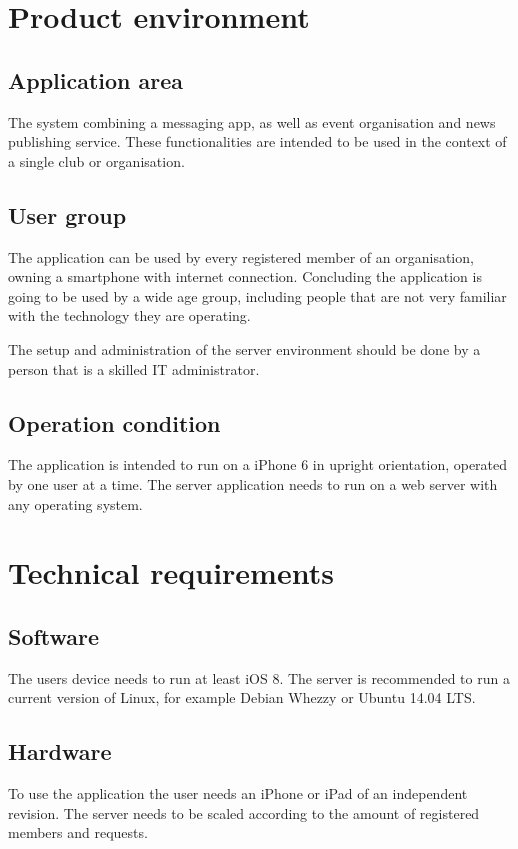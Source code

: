 \chapter{Product environment}
\section{Application area}
The system combining a messaging app, as well as event organisation and news publishing service. These functionalities are intended to be used in the context of a single club or organisation.

\section{User group}
The application can be used by every registered member of an organisation, owning a smartphone with internet connection. Concluding the application is going to be used by a wide age group, including people that are not very familiar with the technology they are operating.

The setup and administration of the server environment should be done by a person that is a skilled IT administrator.

\section{Operation condition}
The application is intended to run on a iPhone 6 in upright orientation, operated by one user at a time. The server application needs to run on a web server with any operating system.

\chapter{Technical requirements}
\section{Software}
The users device needs to run at least iOS 8. The server is recommended to run a current version of Linux, for example Debian Whezzy or Ubuntu 14.04 LTS.

\section{Hardware}
To use the application the user needs an iPhone or iPad of an independent revision. The server needs to be scaled according to the amount of registered members and requests.

